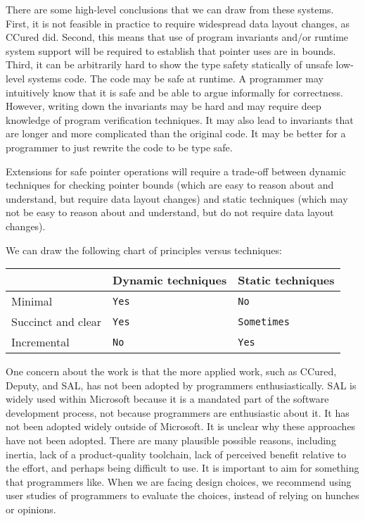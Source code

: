 There are some high-level conclusions that we can draw from these
systems. First, it is not feasible in practice to require widespread
data layout changes, as CCured did. Second, this means that use of
program invariants and/or runtime system support will be required to
establish that pointer uses are in bounds. Third, it can be arbitrarily
hard to show the type safety statically of unsafe low-level systems
code. The code may be safe at runtime. A programmer may intuitively know
that it is safe and be able to argue informally for correctness.
However, writing down the invariants may be hard and may require deep
knowledge of program verification techniques. It may also lead to
invariants that are longer and more complicated than the original code.
It may be better for a programmer to just rewrite the code to be type
safe.

Extensions for safe pointer operations will require a trade-off between
dynamic techniques for checking pointer bounds (which are easy to reason
about and understand, but require data layout changes) and static
techniques (which may not be easy to reason about and understand, but do
not require data layout changes).

We can draw the following chart of principles versus techniques:

\begin{longtable}[c]{@{}lll@{}}
\toprule
& Dynamic techniques & Static techniques\tabularnewline
\midrule
\endhead
Minimal & \texttt{Yes} & \texttt{No}\tabularnewline
Succinct and clear & \texttt{Yes} & \texttt{Sometimes}\tabularnewline
Incremental & \texttt{No} & \texttt{Yes}\tabularnewline
\bottomrule
\end{longtable}

One concern about the work is that the more applied work, such as
CCured, Deputy, and SAL, has not been adopted by programmers
enthusiastically. SAL is widely used within Microsoft because it is a
mandated part of the software development process, not because
programmers are enthusiastic about it. It has not been adopted widely
outside of Microsoft. It is unclear why these approaches have not been
adopted. There are many plausible possible reasons, including inertia,
lack of a product-quality toolchain, lack of perceived benefit relative
to the effort, and perhaps being difficult to use. It is important to
aim for something that programmers like. When we are facing design
choices, we recommend using user studies of programmers to evaluate the
choices, instead of relying on hunches or opinions.

